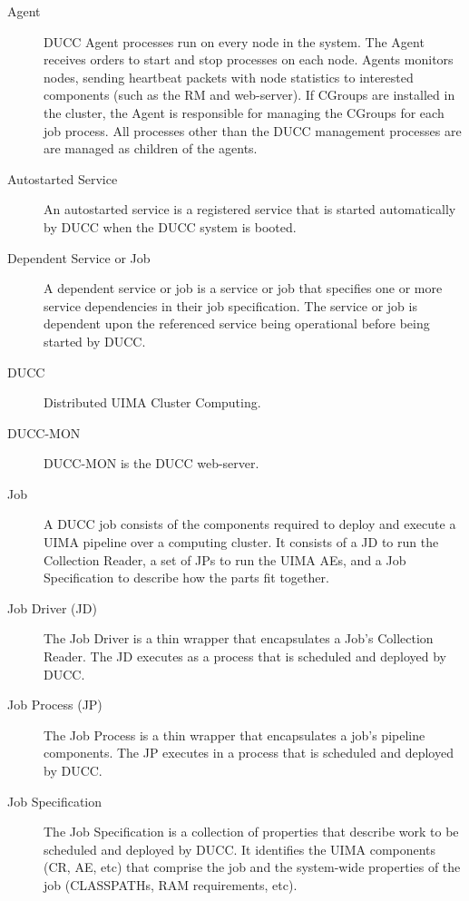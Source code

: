 \begin{description}

\item[Agent] DUCC Agent processes run on every node in the system. The Agent receives orders to
  start and stop processes on each node. Agents monitors nodes, sending heartbeat packets with node
  statistics to interested components (such as the RM and web-server). If CGroups are installed in
  the cluster, the Agent is responsible for managing the CGroups for each job process. All processes
  other than the DUCC management processes are are managed as children of the agents.

\item[Autostarted Service] An autostarted service is a registered service that is started automatically
  by DUCC when the DUCC system is booted.

\item[Dependent Service or Job] A dependent service or job is a service or job that specifies one
  or more service dependencies in their job specification. The service or job is dependent upon the
  referenced service being operational before being started by DUCC.

\item[DUCC] Distributed UIMA Cluster Computing.

\item[DUCC-MON]  DUCC-MON is the DUCC web-server.

\item[Job] A DUCC job consists of the components required to deploy and execute a UIMA pipeline over
  a computing cluster. It consists of a JD to run the Collection Reader, a set of JPs to run the UIMA
  AEs, and a Job Specification to describe how the parts fit together.

\item[Job Driver (JD)]The Job Driver is a thin wrapper that encapsulates a Job's Collection
  Reader. The JD executes as a process that is scheduled and deployed by DUCC.

\item[Job Process (JP)] The Job Process is a thin wrapper that encapsulates a job's pipeline
  components. The JP executes in a process that is scheduled and deployed by DUCC.

\item[Job Specification] The Job Specification is a collection of properties that describe work to be
  scheduled and deployed by DUCC. It
  identifies the UIMA components (CR, AE, etc) that comprise the job and the system-wide
  properties of the job (CLASSPATHs, RAM requirements, etc). 


\end{description}
